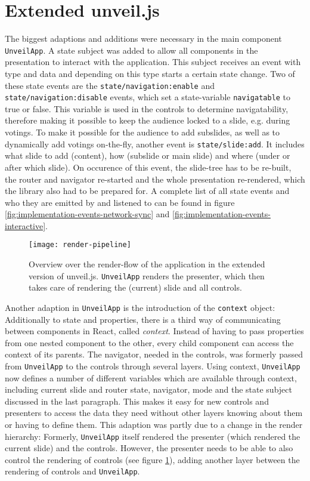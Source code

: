\section{Extended unveil.js}
\label{sec:implementation-unveil}
The biggest adaptions and additions were necessary in the main component \texttt{UnveilApp}. A state subject was added to allow all components in the presentation to interact with the application. This subject receives an event with type and data and depending on this type starts a certain state change. Two of these state events are the \texttt{state/navigation:enable} and \texttt{state/navigation:disable} events, which set a state-variable \texttt{navigatable} to true or false. This variable is used in the controls to determine navigatability, therefore making it possible to keep the audience locked to a slide, e.g. during votings.
To make it possible for the audience to add subslides, as well as to dynamically add votings on-the-fly, another event is \texttt{state/slide:add}. It includes what slide to add (content), how (subslide or main slide) and where (under or after which slide). On occurence of this event, the slide-tree has to be re-built, the router and navigator re-started and the whole presentation re-rendered, which the library also had to be prepared for. A complete list of all state events and who they are emitted by and listened to can be found in figure \ref{fig:implementation-events-network-sync} and \ref{fig:implementation-events-interactive}.

\begin{figure}
\centering
\texttt{[image: render-pipeline]}
\caption{Overview over the render-flow of the application in the extended version of unveil.js. \texttt{UnveilApp} renders the presenter, which then takes care of rendering the (current) slide and all controls.}
\label{fig:implementation-unveil-render-pipeline}
\end{figure}

Another adaption in \texttt{UnveilApp} is the introduction of the \texttt{context} object: Additionally to state and properties, there is a third way of communicating between components in React, called \emph{context}. Instead of having to pass properties from one nested component to the other, every child component can access the context of its parents. The navigator, needed in the controls, was formerly passed from \texttt{UnveilApp} to the controls through several layers. Using context, \texttt{UnveilApp} now defines a number of different variables which are available through context, including current slide and router state, navigator, mode and the state subject discussed in the last paragraph. This makes it easy for new controls and presenters to access the data they need without other layers knowing about them or having to define them.
This adaption was partly due to a change in the render hierarchy: Formerly, \texttt{UnveilApp} itself rendered the presenter (which rendered the current slide) and the controls. However, the presenter needs to be able to also control the rendering of controls (see figure \ref{fig:implementation-unveil-render-pipeline}), adding another layer between the rendering of controls and \texttt{UnveilApp}.

